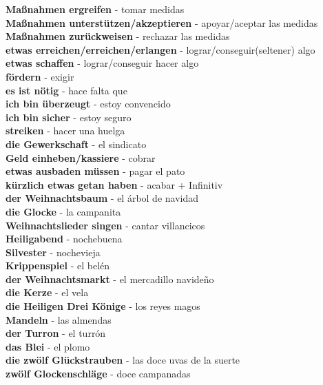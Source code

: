 \documentclass{article}
\title{\vspace{-3cm}}
\author{Andreas Hofer}
\begin{document}
	\begin{multicols}{2}
	\textbf{Maßnahmen ergreifen} - tomar medidas \\
	\textbf{Maßnahmen unterstützen/akzeptieren} - apoyar/aceptar las medidas \\
	\textbf{Maßnahmen zurückweisen} - rechazar las medidas \\
	\textbf{etwas erreichen/erreichen/erlangen} - lograr/conseguir(seltener) algo \\
	\textbf{etwas schaffen} - lograr/conseguir hacer algo \\
	\textbf{fördern} - exigir \\
	\textbf{es ist nötig} - hace falta que \\
	\textbf{ich bin überzeugt} - estoy convencido \\
	\textbf{ich bin sicher} - estoy seguro \\
	\textbf{streiken} - hacer una huelga \\
	\textbf{die Gewerkschaft} - el sindicato \\
	\textbf{Geld einheben/kassiere } - cobrar \\
	\textbf{etwas ausbaden müssen} - pagar el pato \\
	\textbf{kürzlich etwas getan haben} - acabar + Infinitiv \\
	\textbf{der Weihnachtsbaum} - el árbol de navidad \\
	\textbf{die Glocke} - la campanita \\
	\textbf{Weihnachtslieder singen} - cantar villancicos \\
	\textbf{Heiligabend} - nochebuena \\
	\textbf{Silvester} - nochevieja \\
	\textbf{Krippenspiel} - el belén \\
	\textbf{der Weihnachtsmarkt} - el mercadillo navideño \\
	\textbf{die Kerze} - el vela \\
	\textbf{die Heiligen Drei Könige} - los reyes magos \\
	\textbf{Mandeln} - las almendas \\
	\textbf{der Turron} - el turrón \\
	\textbf{das Blei} - el plomo \\
	\textbf{die zwölf Glückstrauben} - las doce uvas de la suerte \\
	\textbf{zwölf Glockenschläge} - doce campanadas \\
	
	
	\end{multicols}
	
\end{document}
